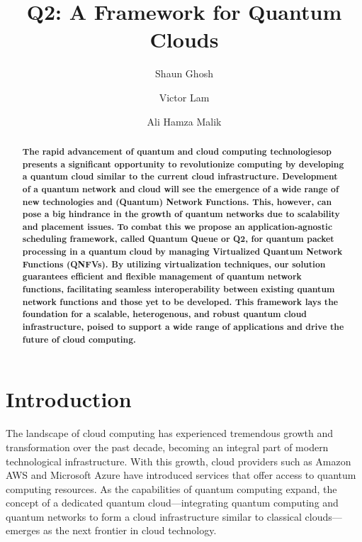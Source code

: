 \documentclass[sigplan,screen]{acmart}
\begin{document}
\title{Q2: A Framework for Quantum Clouds}

\author{Shaun Ghosh}

\author{Victor Lam}


\author{Ali Hamza Malik}

\renewcommand{\shortauthors}{Ghosh, Lam, Malik}


\begin{abstract}
\textbf{The rapid advancement of quantum and cloud computing technologiesop  presents a significant opportunity to revolutionize computing by developing a quantum cloud similar to the current cloud infrastructure. Development of a quantum network and cloud will see the emergence of a wide range of new technologies and (Quantum) Network Functions. This, however, can pose a big hindrance in the growth of quantum networks due to scalability and placement issues. To combat this we propose an application-agnostic scheduling framework, called Quantum Queue or Q2, for quantum packet processing in a quantum cloud by managing Virtualized Quantum Network Functions (QNFVs). By utilizing virtualization techniques, our solution guarantees efficient and flexible management of quantum network functions, facilitating seamless interoperability between existing quantum network functions and those yet to be developed. This framework lays the foundation for a scalable, heterogenous, and robust quantum cloud infrastructure, poised to support a wide range of applications and drive the future of cloud computing.
}
\end{abstract}


\maketitle

\section{Introduction}
The landscape of cloud computing has experienced tremendous growth and transformation over the past decade, becoming an integral part of modern technological infrastructure. With this growth, cloud providers such as Amazon AWS and Microsoft Azure have introduced services that offer access to quantum computing resources. As the capabilities of quantum computing expand, the concept of a dedicated quantum cloud—integrating quantum computing and quantum networks to form a cloud infrastructure similar to classical clouds—emerges as the next frontier in cloud technology.
\end{document}
